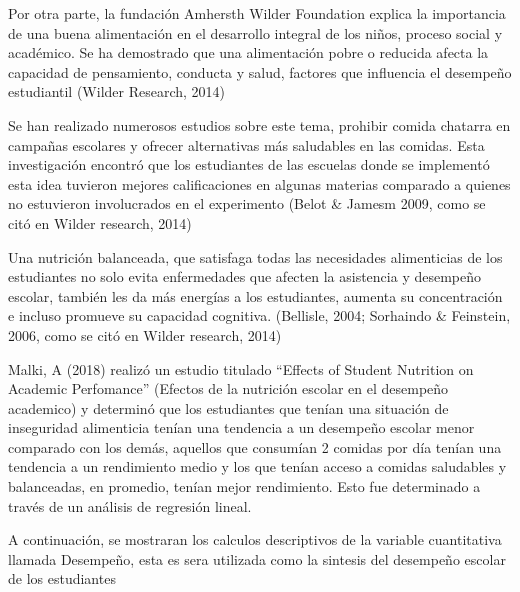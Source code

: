 \documentclass[
]{article}
\begin{document}
Por otra parte, la fundación Amhersth Wilder Foundation explica la
importancia de una buena alimentación en el desarrollo integral de los
niños, proceso social y académico. Se ha demostrado que una alimentación
pobre o reducida afecta la capacidad de pensamiento, conducta y salud,
factores que influencia el desempeño estudiantil (Wilder Research, 2014)

Se han realizado numerosos estudios sobre este tema, prohibir comida
chatarra en campañas escolares y ofrecer alternativas más saludables en
las comidas. Esta investigación encontró que los estudiantes de las
escuelas donde se implementó esta idea tuvieron mejores calificaciones
en algunas materias comparado a quienes no estuvieron involucrados en el
experimento (Belot \& Jamesm 2009, como se citó en Wilder research,
2014)

Una nutrición balanceada, que satisfaga todas las necesidades
alimenticias de los estudiantes no solo evita enfermedades que afecten
la asistencia y desempeño escolar, también les da más energías a los
estudiantes, aumenta su concentración e incluso promueve su capacidad
cognitiva. (Bellisle, 2004; Sorhaindo \& Feinstein, 2006, como se citó
en Wilder research, 2014)

Malki, A (2018) realizó un estudio titulado ``Effects of Student
Nutrition on Academic Perfomance'' (Efectos de la nutrición escolar en
el desempeño academico) y determinó que los estudiantes que tenían una
situación de inseguridad alimenticia tenían una tendencia a un desempeño
escolar menor comparado con los demás, aquellos que consumían 2 comidas
por día tenían una tendencia a un rendimiento medio y los que tenían
acceso a comidas saludables y balanceadas, en promedio, tenían mejor
rendimiento. Esto fue determinado a través de un análisis de regresión
lineal.

A continuación, se mostraran los calculos descriptivos de la variable
cuantitativa llamada Desempeño, esta es sera utilizada como la sintesis
del desempeño escolar de los estudiantes
\end{document}
